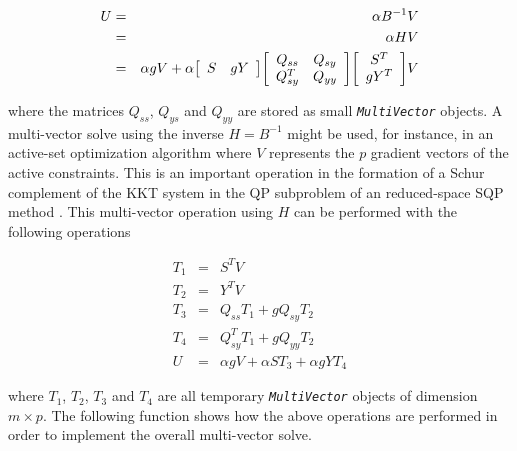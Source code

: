 \documentclass[10pt,fleqn]{article}
\begin{document}
\begin{eqnarray*}
U & = & \alpha B^{-1} V \\
  & = & \alpha H V \\
  & = & \alpha g V + \alpha
                            {\bmat{cc} S & g Y \emat}
                            {\bmat{cc} Q_{ss} & Q_{sy} \\ Q_{sy}^T & Q_{yy} \emat}
                            {\bmat{c} S^T \\ g Y^T \emat} V
\end{eqnarray*}

where the matrices $Q_{ss}$, $Q_{ys}$ and $Q_{yy}$ are stored as small
\texttt{\textit{MultiVector}} objects.  A multi-vector solve using
the inverse $H = B^{-1}$ might be used, for instance, in an active-set
optimization algorithm where $V$ represents the $p$ gradient vectors
of the active constraints.  This is an important operation in the
formation of a Schur complement of the KKT system in the QP subproblem
of an reduced-space SQP method \cite{RABartlett_2001}.  This
multi-vector operation using $H$ can be performed with the following
operations

\begin{eqnarray*}
T_1 & = & S^T V \\
T_2 & = & Y^T V \\
T_3 & = & Q_{ss} T_1 + g Q_{sy} T_2 \\
T_4 & = & Q_{sy}^T T_1 + g Q_{yy} T_2 \\
U   & = & \alpha g V + \alpha S T_3 + \alpha g Y T_4
\end{eqnarray*}

where $T_1$, $T_2$, $T_3$ and $T_4$ are all temporary
\texttt{\textit{MultiVector}} objects of dimension $m \times p$.  The
following function shows how the above operations are performed in
order to implement the overall multi-vector solve.
\end{document}
